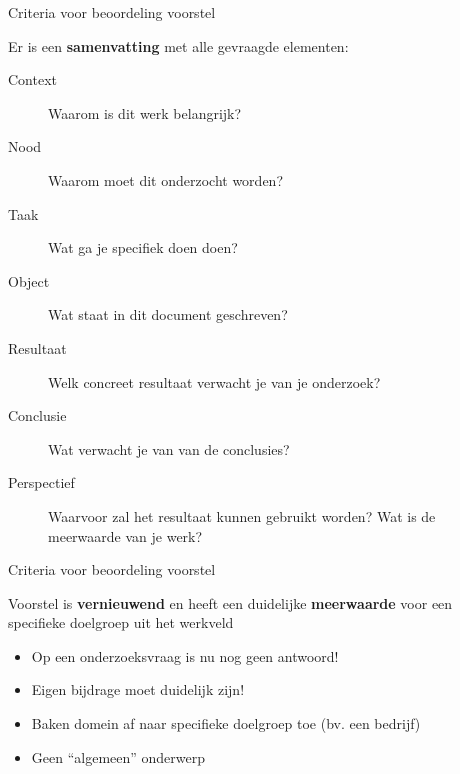 \documentclass[usenames,dvipsnames]{beamer}
\begin{document}
\begin{frame}{Criteria voor beoordeling voorstel}

Er is een \textbf{samenvatting} met alle gevraagde elementen:

\begin{description}
  \item[Context] Waarom is dit werk belangrijk?
  \item[Nood] Waarom moet dit onderzocht worden?
  \item[Taak] Wat ga je specifiek doen doen?
  \item[Object] Wat staat in dit document geschreven?
  \item[Resultaat] Welk concreet resultaat verwacht je van je onderzoek?
  \item[Conclusie] Wat verwacht je van van de conclusies?
  \item[Perspectief] Waarvoor zal het resultaat kunnen gebruikt worden? Wat is de meerwaarde van je werk?
\end{description}


\end{frame}

\begin{frame}{Criteria voor beoordeling voorstel}

Voorstel is \textbf{vernieuwend} en heeft een duidelijke \textbf{meerwaarde} voor een specifieke doelgroep uit het werkveld

\begin{itemize}
  \item Op een onderzoeksvraag is nu nog geen antwoord!
  \item Eigen bijdrage moet duidelijk zijn!
  \item Baken domein af naar specifieke doelgroep toe (bv. een bedrijf)
  \item Geen ``algemeen'' onderwerp
\end{itemize}

\end{frame}
\end{document}
